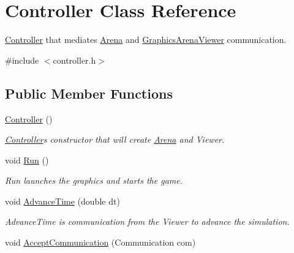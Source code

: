 \hypertarget{classController}{}\section{Controller Class Reference}
\label{classController}


\hyperlink{classController}{Controller} that mediates \hyperlink{classArena}{Arena} and \hyperlink{classGraphicsArenaViewer}{Graphics\+Arena\+Viewer} communication.  




{\ttfamily \#include $<$controller.\+h$>$}

\subsection*{Public Member Functions}
\begin{DoxyCompactItemize}
\item 
\hyperlink{classController_a95c56822d667e94b031451729ce069a9}{Controller} ()\hypertarget{classController_a95c56822d667e94b031451729ce069a9}{}\label{classController_a95c56822d667e94b031451729ce069a9}

\begin{DoxyCompactList}\small\item\em \hyperlink{classController}{Controller}\textquotesingle{}s constructor that will create \hyperlink{classArena}{Arena} and Viewer. \end{DoxyCompactList}\item 
void \hyperlink{classController_a17abb2cec6c0109e9b2df3cdc082eaad}{Run} ()\hypertarget{classController_a17abb2cec6c0109e9b2df3cdc082eaad}{}\label{classController_a17abb2cec6c0109e9b2df3cdc082eaad}

\begin{DoxyCompactList}\small\item\em Run launches the graphics and starts the game. \end{DoxyCompactList}\item 
void \hyperlink{classController_a6a4a3eaee03f6c4718da3f8293d7e053}{Advance\+Time} (double dt)\hypertarget{classController_a6a4a3eaee03f6c4718da3f8293d7e053}{}\label{classController_a6a4a3eaee03f6c4718da3f8293d7e053}

\begin{DoxyCompactList}\small\item\em Advance\+Time is communication from the Viewer to advance the simulation. \end{DoxyCompactList}\item 
void \hyperlink{classController_a55b8d46984535adb91f40309914e8852}{Accept\+Communication} (Communication com)\hypertarget{classController_a55b8d46984535adb91f40309914e8852}{}\label{classController_a55b8d46984535adb91f40309914e8852}


\end{DoxyCompactItemize}
